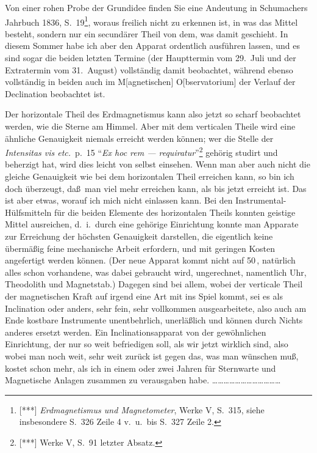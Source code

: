 \documentclass[12pt,a4paper]{article}
\theoremstyle{plain}
\theoremstyle{definition}
\theoremstyle{remark}
\begin{document}
Von einer rohen Probe der Grundidee finden Sie eine Andeutung in
{\sc Schumachers} Jahrbuch 1836, S.~19\footnote{[***] {\it
Erdmagnetismus und Magnetometer}, Werke V, S.~315, siehe insbesondere
S.~326 Zeile 4 v.~u.~bis S.~327 Zeile 2.}, woraus freilich nicht zu
erkennen ist, in was das Mittel besteht, sondern nur ein secund\"arer
Theil von dem, was damit geschieht. In diesem Sommer habe ich aber
den Apparat ordentlich ausf\"uhren lassen, und es sind sogar die
beiden letzten Termine (der Haupttermin vom 29.~Juli und der
Extrater\-min vom 31.~August) vollst\"andig damit beobachtet,
w\"ahrend ebenso vollst\"andig in beiden auch im M[agnetischen]
O[bservatorium] der Verlauf der Declination beobachtet ist.

Der horizontale Theil des Erdmagnetismus kann also jetzt so scharf
beobachtet werden, wie die Sterne am Himmel. Aber mit dem verticalen
Theile wird eine \"ahnliche Genauigkeit niemals erreicht werden k\"onnen;
wer die Stelle der {\it Intensitas vis etc.}~p.~15 ``{\it Ex hoc rem
--- requiratur}''\footnote{[***] Werke V, S.~91 letzter Absatz.}
geh\"orig studirt und beherzigt hat, wird dies leicht von selbst
einsehen. Wenn man aber auch nicht die gleiche Genauigkeit wie bei
dem horizontalen Theil erreichen kann, so bin ich doch \"uberzeugt,
da\ss\ man viel mehr erreichen kann, als bis jetzt erreicht ist. Das
ist aber etwas, worauf ich mich nicht einlassen kann. Bei den
Instrumental-H\"ulfsmitteln f\"ur die beiden Elemente des horizontalen
Theils konnten geistige Mittel ausreichen, d.~i.~durch eine geh\"orige
Einrichtung konnte man Apparate zur Erreichung der h\"ochsten
Genauigkeit darstellen, die eigentlich keine \"uberm\"a\ss ig feine
mechanische Arbeit erfordern, und mit geringen Kosten angefertigt
werden k\"onnen. (Der neue Apparat kommt nicht auf 50\,\textdollaroldstyle,
nat\"urlich alles schon vorhandene, was dabei gebraucht wird,
ungerechnet, namentlich Uhr, Theodolith und Magnetstab.) Dagegen
sind bei allem, wobei der verticale Theil der magnetischen Kraft auf
irgend eine Art mit ins Spiel kommt, sei es als Inclination oder
anders, sehr fein, sehr vollkommen ausgearbeitete, also auch am Ende
kostbare Instrumente unentbehrlich, unerl\"a\ss lich und k\"onnen durch
Nichts anderes ersetzt werden. Ein Inclinationsapparat von der
gew\"ohnlichen Einrichtung, der nur so weit befriedigen soll, als wir
jetzt wirklich sind, also wobei man noch weit, sehr weit zur\"uck ist
gegen das, was man w\"unschen mu\ss, kostet schon mehr, als ich in
einem oder zwei Jahren f\"ur Sternwarte und Magnetische Anlagen
zusammen zu verausgaben habe.
\ldots\ldots\ldots\ldots\ldots\ldots\ldots\ldots\ldots\ldots\ldots\ldots
\end{document}
